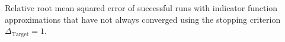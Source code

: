 Relative root mean squared error of successful runs with indicator function approximations that have not always converged using the stopping criterion $\Delta_{\text{Target}} = 1$.
